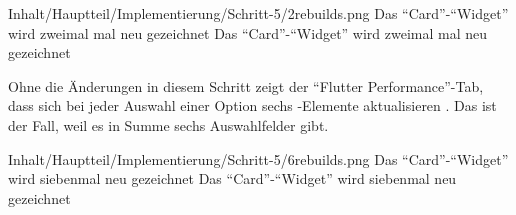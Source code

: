 \begin{alexfigure}{Inhalt/Hauptteil/Implementierung/Schritt-5/2rebuilds.png}
  {Das \enquote{Card}-\enquote{Widget} wird zweimal mal neu gezeichnet}
  {Das \enquote{Card}-\enquote{Widget} wird zweimal mal neu gezeichnet}

  \label{fig:Schritt52rebuilds}

\end{alexfigure}

Ohne die Änderungen in diesem Schritt zeigt der \enquote{Flutter Performance}-Tab, dass sich bei jeder Auswahl einer Option sechs -Elemente aktualisieren \Abb{\ref{fig:Schritt56rebuilds}}.
Das ist der Fall, weil es in Summe sechs Auswahlfelder gibt.

\begin{alexfigure}{Inhalt/Hauptteil/Implementierung/Schritt-5/6rebuilds.png}
  {Das \enquote{Card}-\enquote{Widget} wird siebenmal neu gezeichnet}
  {Das \enquote{Card}-\enquote{Widget} wird siebenmal neu gezeichnet}

  \label{fig:Schritt56rebuilds}

\end{alexfigure}
